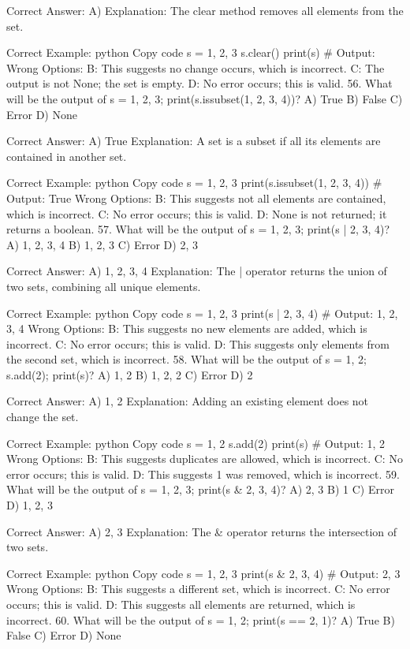 Correct Answer: A) {}
Explanation: The clear method removes all elements from the set.

Correct Example:
python
Copy code
s = {1, 2, 3}
s.clear()
print(s)  # Output: {}
Wrong Options:
B: This suggests no change occurs, which is incorrect.
C: The output is not None; the set is empty.
D: No error occurs; this is valid.
56. What will be the output of s = {1, 2, 3}; print(s.issubset({1, 2, 3, 4}))?
A) True
B) False
C) Error
D) None

Correct Answer: A) True
Explanation: A set is a subset if all its elements are contained in another set.

Correct Example:
python
Copy code
s = {1, 2, 3}
print(s.issubset({1, 2, 3, 4}))  # Output: True
Wrong Options:
B: This suggests not all elements are contained, which is incorrect.
C: No error occurs; this is valid.
D: None is not returned; it returns a boolean.
57. What will be the output of s = {1, 2, 3}; print(s | {2, 3, 4})?
A) {1, 2, 3, 4}
B) {1, 2, 3}
C) Error
D) {2, 3}

Correct Answer: A) {1, 2, 3, 4}
Explanation: The | operator returns the union of two sets, combining all unique elements.

Correct Example:
python
Copy code
s = {1, 2, 3}
print(s | {2, 3, 4})  # Output: {1, 2, 3, 4}
Wrong Options:
B: This suggests no new elements are added, which is incorrect.
C: No error occurs; this is valid.
D: This suggests only elements from the second set, which is incorrect.
58. What will be the output of s = {1, 2}; s.add(2); print(s)?
A) {1, 2}
B) {1, 2, 2}
C) Error
D) {2}

Correct Answer: A) {1, 2}
Explanation: Adding an existing element does not change the set.

Correct Example:
python
Copy code
s = {1, 2}
s.add(2)
print(s)  # Output: {1, 2}
Wrong Options:
B: This suggests duplicates are allowed, which is incorrect.
C: No error occurs; this is valid.
D: This suggests 1 was removed, which is incorrect.
59. What will be the output of s = {1, 2, 3}; print(s & {2, 3, 4})?
A) {2, 3}
B) {1}
C) Error
D) {1, 2, 3}

Correct Answer: A) {2, 3}
Explanation: The & operator returns the intersection of two sets.

Correct Example:
python
Copy code
s = {1, 2, 3}
print(s & {2, 3, 4})  # Output: {2, 3}
Wrong Options:
B: This suggests a different set, which is incorrect.
C: No error occurs; this is valid.
D: This suggests all elements are returned, which is incorrect.
60. What will be the output of s = {1, 2}; print(s == {2, 1})?
A) True
B) False
C) Error
D) None


